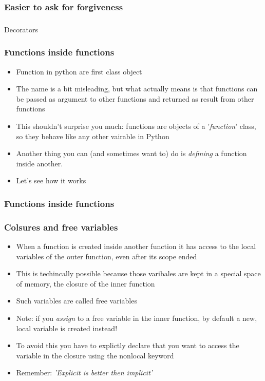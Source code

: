 \documentclass[9pt]{beamer}
\begin{document}
\begin{frame}
  \frametitle{Easier to ask for forgiveness}
  
\end{frame}


\begin{frame}
  \frametitle{}
    \centering \Large Decorators
\end{frame}


\begin{frame}
  \frametitle{Functions inside functions}
  \begin{itemize}
    \item Function in python are \alert{first class object}
    \item The name is a bit misleading, but what actually means is that functions
          can be passed as argument to other functions and returned as result from
          other functions
    \item This shouldn't surprise you much: functions are objects of a
          '\emph{function}' class, so they behave like any other vairable in
          Python
    \item Another thing you can (and sometimes want to) do is \emph{defining} a
          function inside another.
    \item Let's see how it works
  \end{itemize}
  
\end{frame}


\begin{frame}
  \frametitle{Functions inside functions}
  
\end{frame}


\begin{frame}
  \frametitle{Colsures and free variables}
  \begin{itemize}
    \item When a function is created inside another function it has access to the local variables
          of the outer function, even after its scope ended
    \item This is techincally possible because those varibales are kept in a special
          space of memory, the \alert{closure} of the inner function
    \item Such variables are called \alert{free variables}
    \item Note: if you \emph{assign} to a free variable in the inner function, 
          by default a new, local variable is created instead!
    \item To avoid this you have to explictly declare that you want to access the variable in
          the closure using the \alert{nonlocal} keyword
    \item Remember: \emph{'Explicit is better then implicit'}
  \end{itemize}
  
\end{frame}
\end{document}
